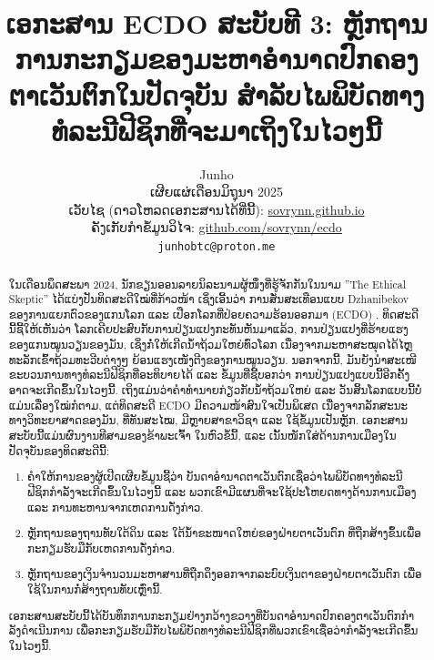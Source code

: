 \documentclass[10pt,twocolumn,letterpaper]{article}
\begin{document}
\title{ເອກະສານ ECDO ສະບັບທີ 3: ຫຼັກຖານການກະກຽມຂອງມະຫາອຳນາດປົກຄອງຕາເວັນຕົກໃນປັດຈຸບັນ ສໍາລັບໄພພິບັດທາງທໍລະນີຟີຊິກທີ່ຈະມາເຖິງໃນໄວໆນີ້}

\author{Junho\\
ເຜີຍແຜ່ເດືອນມິຖຸນາ 2025\\
ເວັບໄຊ (ດາວໂຫລດເອກະສານໄດ້ທີ່ນີ້): \href{https://sovrynn.github.io}{sovrynn.github.io}\\
ຄັງເກັບກຳຂໍ້ມູນວິໄຈ: \href{https://github.com/sovrynn/ecdo}{github.com/sovrynn/ecdo}\\
{\tt\small junhobtc@proton.me}
}

\maketitle

\begin{abstract}
ໃນເດືອນພຶດສະພາ 2024, ນັກຂຽນອອນລາຍນິລະນາມຜູ້ໜຶ່ງທີ່ຮູ້ຈັກກັນໃນນາມ ”The Ethical Skeptic” \cite{0} ໄດ້ແບ່ງປັນທິດສະດີໃໝ່ທີ່ກ້າວໜ້າ ເຊິ່ງເອີ້ນວ່າ ການສັ່ນສະເທືອນແບບ Dzhanibekov ຂອງການແຍກຕົວຂອງແກນໂລກ ແລະ ເປືອກໂລກທີ່ປ່ອຍຄວາມຮ້ອນອອກມາ (ECDO) \cite{1}.
ທິດສະດີນີ້ຊີ້ໃຫ້ເຫັນວ່າ ໂລກເຄີຍປະສົບກັບການປ່ຽນແປງກະທັນຫັນມາແລ້ວ, ການປ່ຽນແປງທີ່ຮ້າຍແຮງຂອງແກນໝູນວຽນຂອງມັນ, ເຊິ່ງກໍ່ໃຫ້ເກີດນໍ້າຖ້ວມໃຫຍ່ທົ່ວໂລກ ເນື່ອງຈາກມະຫາສະໝຸດໄດ້ໄຫຼທະລັກເຂົ້າຖ້ວມທະວີບຕ່າງໆ ຍ້ອນແຮງເໜັງຕີງຂອງການໝູນວຽນ. ນອກຈາກນີ້, ມັນຍັງນຳສະເໜີຂະບວນການທາງທໍລະນີຟີຊິກທີ່ອະທິບາຍໄດ້ ແລະ ຂໍ້ມູນທີ່ຊີ້ບອກວ່າ ການປ່ຽນແປງແບບນີ້ອີກຄັ້ງອາດຈະເກີດຂຶ້ນໃນໄວໆນີ້. 
ເຖິງແມ່ນວ່າຄຳທຳນາຍກ່ຽວກັບນໍ້າຖ້ວມໃຫຍ່ ແລະ ວັນສິ້ນໂລກແບບນີ້ບໍ່ແມ່ນເລື່ອງໃໝ່ກໍຕາມ, ແຕ່ທິດສະດີ ECDO ມີຄວາມໜ້າສົນໃຈເປັນພິເສດ ເນື່ອງຈາກລັກສະນະທາງວິທະຍາສາດຂອງມັນ, ທີ່ທັນສະໄໝ, ມີຫຼາຍສາຂາວິຊາ ແລະ ໃຊ້ຂໍ້ມູນເປັນຫຼັກ.
ເອກະສານສະບັບນີ້ແມ່ນຜົນງານທີສາມຂອງຂ້າພະເຈົ້າ \cite{2,3} ໃນຫົວຂໍ້ນີ້, ແລະ ເນັ້ນໜັກໃສ່ດ້ານການເມືອງໃນປັດຈຸບັນຂອງທິດສະດີນີ້: 
\begin{flushleft}
\begin{enumerate}
    \item ຄໍາໃຫ້ການຂອງຜູ້ເປີດເຜີຍຂໍ້ມູນຊີ້ວ່າ ບັນດາອໍານາດຕາເວັນຕົກເຊື່ອວ່າໄພພິບັດທາງທໍລະນີຟີຊິກກຳລັງຈະເກີດຂຶ້ນໃນໄວໆນີ້ ແລະ ພວກເຂົາມີແຜນທີ່ຈະໃຊ້ປະໂຫຍດທາງດ້ານການເມືອງ ແລະ ການທະຫານຈາກເຫດການດັ່ງກ່າວ.
    \item ຫຼັກຖານຂອງຖານທັບໃຕ້ດິນ ແລະ ໃຕ້ນໍ້າຂະໜາດໃຫຍ່ຂອງຝ່າຍຕາເວັນຕົກ ທີ່ຖືກສ້າງຂຶ້ນເພື່ອກະກຽມຮັບມືກັບເຫດການດັ່ງກ່າວ.
    \item ຫຼັກຖານຂອງເງິນຈໍານວນມະຫາສານທີ່ຖືກດຶງອອກຈາກລະບົບເງິນຕາຂອງຝ່າຍຕາເວັນຕົກ ເພື່ອໃຊ້ໃນການກໍ່ສ້າງຖານທັບເຫຼົ່ານີ້. 
\end{enumerate}
\end{flushleft}

ເອກະສານສະບັບນີ້ໄດ້ບັນທຶກການກະກຽມຢ່າງກວ້າງຂວາງທີ່ບັນດາອຳນາດປົກຄອງຕາເວັນຕົກກຳລັງດໍາເນີນການ ເພື່ອກະກຽມຮັບມືກັບໄພພິບັດທາງທໍລະນີຟີຊິກທີ່ພວກເຂົາເຊື່ອວ່າກຳລັງຈະເກີດຂຶ້ນໃນໄວໆນີ້.
\end{abstract}
\end{document}

